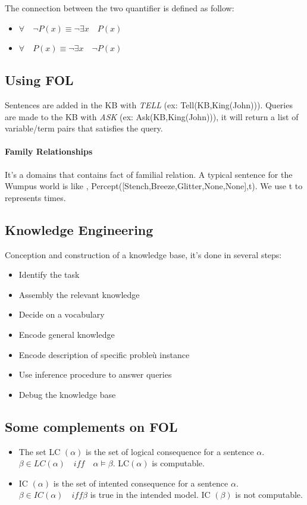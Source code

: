 	The connection between the two quantifier is defined as follow:
	\begin{itemize}
		\item $\forall\quad \neg P(x) \equiv \neg\exists x \quad P(x) $
		\item $\forall\quad P(x) \equiv \neg\exists x \quad \neg P(x)$
	\end{itemize}
\subsection{Using FOL}
	Sentences are added in the KB  with \textit{TELL} (ex: Tell(KB,King(John))). Queries are made to the 	
	KB with \textit{ASK} (ex: Ask(KB,King(John))), it will return a list of variable/term pairs that
	satisfies the query.
	\paragraph{Family Relationships} It's a domains that contains fact of familial relation.
	A typical sentence for the Wumpus world is like , Percept([Stench,Breeze,Glitter,None,None],t). We use t to 
	represents times.
\subsection{Knowledge Engineering}
	Conception and construction of a knowledge base, it's done in several steps:
	\begin{multicols}{2}
		\begin{itemize}
			\item Identify the task
			\item Assembly the relevant knowledge
			\item Decide on a vocabulary
			\item Encode general knowledge
			\item Encode description of specific probleù instance
			\item Use inference procedure to answer queries
			\item Debug the knowledge base
		\end{itemize}
	\end{multicols}
\subsection{Some complements on FOL}
	\begin{itemize}
		\item The set LC $(\alpha)$ is the set of logical consequence for a sentence $\alpha$. 
		 $\beta \in LC(\alpha) \quad iff \quad \alpha \models \beta$. LC$(\alpha)$ is computable.
	
		\item IC $(\alpha)$ is the set of intented consequence for a sentence $\alpha$.
		$\beta \in IC(\alpha) \quad iff \beta$ is true in the intended model. IC $(\beta)$ is not 
		computable.
	\end{itemize}	
